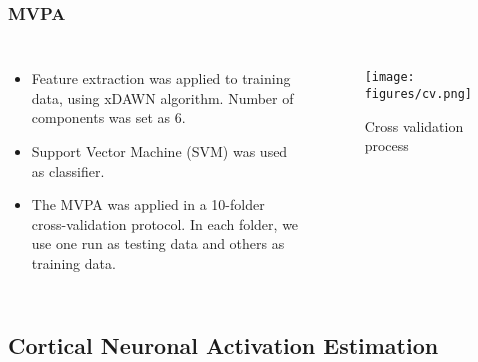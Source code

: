 \documentclass[aspectratio=169]{beamer}
\begin{document}
\begin{frame}
    \frametitle{MVPA}

    \begin{columns}

        \begin{itemize}
            \item Feature extraction was applied to training data, using xDAWN algorithm.
                  Number of components was set as $6$.
            \item Support Vector Machine (SVM) was used as classifier.
            \item The MVPA was applied in a 10-folder cross-validation protocol.
                  In each folder, we use one run as testing data and others as training data.
        \end{itemize}


        \begin{figure}[h]
            \centering
            \texttt{[image: figures/cv.png]}
            \caption{Cross validation process}
        \end{figure}

    \end{columns}

\end{frame}

\subsection{Cortical Neuronal Activation Estimation}
\end{document}
